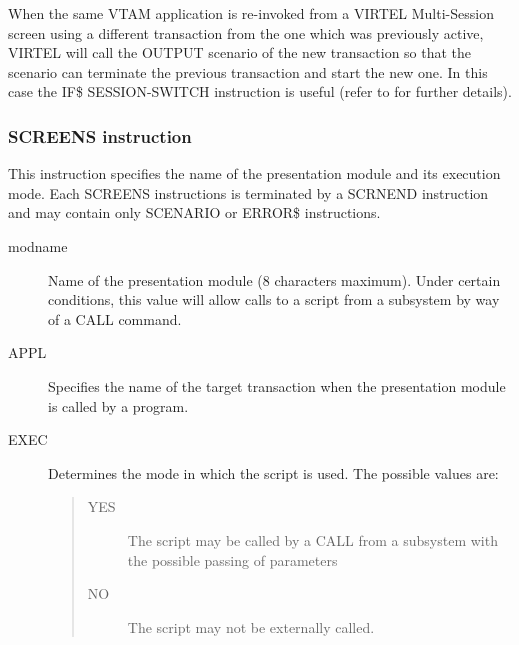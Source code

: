 \documentclass[letterpaper,10pt,english]{sphinxmanual}
\begin{document}
When the same VTAM application is re-invoked from a VIRTEL Multi-Session screen using a different transaction from
the one which was previously active, VIRTEL will call the OUTPUT scenario of the new transaction so that the scenario
can terminate the previous transaction and start the new one. In this case the IF\$ SESSION-SWITCH instruction is
useful (refer to {\hyperref[\detokenize{User_Guide:v457ug-if}]{}} for further details).


\subsubsection{SCREENS instruction}
\label{\detokenize{User_Guide:screens-instruction}}
This instruction specifies the name of the presentation module and its execution mode. Each SCREENS instructions is
terminated by a SCRNEND instruction and may contain only SCENARIO or ERROR\$ instructions.

\begin{sphinxVerbatim}[commandchars=\\\{\}]
  
\end{sphinxVerbatim}
\begin{description}
\item[{modname}] \leavevmode
Name of the presentation module (8 characters maximum). Under certain conditions, this value will allow calls to a script from a subsystem by way of a CALL command.

\item[{APPL}] \leavevmode
Specifies the name of the target transaction when the presentation module is called by a program.

\item[{EXEC}] \leavevmode
Determines the mode in which the script is used. The possible values are:
\begin{quote}
\begin{description}
\item[{YES}] \leavevmode
The script may be called by a CALL from a subsystem with the possible passing of parameters

\item[{NO}] \leavevmode
The script may not be externally called.

\end{description}
\end{quote}

\end{description}
\end{document}
